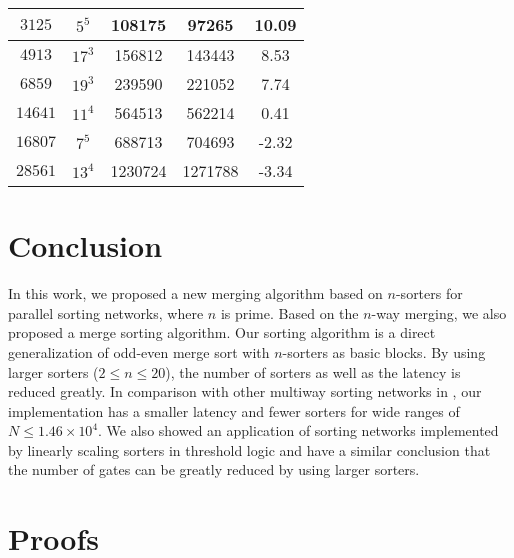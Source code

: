 \documentclass[10pt,journal,cspaper,compsoc]{IEEEtran}
\begin{document}
\begin{table}[!t]
\begin{center}
{\begin{tabular}{|c|c|c|c|c|}
\hline
$3125$ & $5^{5}$   &   108175  &   97265  &   10.09   \\
\hline
$4913$ & $17^{3}$   &   156812  &   143443  &   8.53  \\
\hline
$6859$ & $19^{3}$   &   239590  &   221052  &   7.74  \\
\hline
$14641$ & $11^{4}$   &   564513  &   562214  &   0.41  \\
\hline
$16807$ & $7^{5}$   &   688713  &   704693 &  -2.32 \\
\hline
$28561$ & $13^{4}$  &   1230724 &   1271788 &   -3.34\\
\hline
\end{tabular}
}
\end{center}
\end{table}


\section{Conclusion}
\label{sec:conclusion}
In this work, we proposed a new merging algorithm based on $n$-sorters for parallel sorting networks, where $n$ is prime. Based on the $n$-way merging, we also proposed a merge sorting algorithm. Our sorting algorithm is a direct generalization of odd-even merge sort with $n$-sorters as basic blocks.
By using larger sorters ($2 \le n \le 20$), the number of sorters as well as the latency is reduced greatly. In comparison with other multiway sorting networks in \cite{gao1997sloping}, our implementation has a smaller latency and fewer sorters for wide ranges of $N\le 1.46\times 10^4$. We also showed an application of sorting networks implemented by linearly scaling sorters in threshold logic and have a similar conclusion that the number of gates can be greatly reduced by using larger sorters.




\appendices
\section{Proofs}
\end{document}
